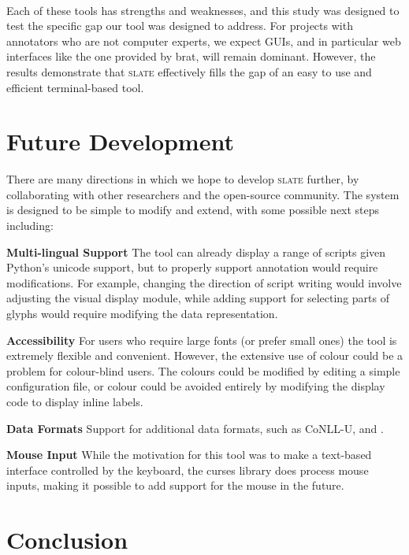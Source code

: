 \documentclass[11pt,a4paper]{article}
\newcommand{\tightparagraph}[1]{\noindent\textbf{#1}}
\newcommand\slate{\textsc{slate}\xspace}
\begin{document}
\paragraph{}
Each of these tools has strengths and weaknesses, and this study was designed to test the specific gap our tool was designed to address.
For projects with annotators who are not computer experts, we expect GUIs, and in particular web interfaces like the one provided by brat, will remain dominant.
However, the results demonstrate that \slate effectively fills the gap of an easy to use and efficient terminal-based tool.

\section{Future Development}

There are many directions in which we hope to develop \slate further, by collaborating with other researchers and the open-source community.
The system is designed to be simple to modify and extend, with some possible next steps including:

\tightparagraph{Multi-lingual Support}
The tool can already display a range of scripts given Python's unicode support, but to properly support annotation would require modifications.
For example, changing the direction of script writing would involve adjusting the visual display module, while adding support for selecting parts of glyphs would require modifying the data representation.

\tightparagraph{Accessibility}
For users who require large fonts (or prefer small ones) the tool is extremely flexible and convenient.
However, the extensive use of colour could be a problem for colour-blind users.
The colours could be modified by editing a simple configuration file, or colour could be avoided entirely by modifying the display code to display inline labels.

\tightparagraph{Data Formats}
Support for additional data formats, such as CoNLL-U, and \citet{data-iso}.

\tightparagraph{Mouse Input}
While the motivation for this tool was to make a text-based interface controlled by the keyboard, the curses library does process mouse inputs, making it possible to add support for the mouse in the future.

\section{Conclusion}
\end{document}

